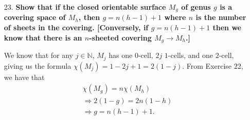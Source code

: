 \documentclass[a4paper,12pt]{article}
\begin{document}
\begin{enumerate}
    \item[23.]
        \boldmath\textbf{Show that if the closed orientable surface $M_g$ of genus $g$ is a covering space of $M_h$, then $g = n(h - 1) + 1$ where $n$ is the number of sheets in the covering. [Conversely, if $g = n(h - 1) + 1$ then we know that there is an $n$-sheeted covering $M_g \to M_h$.]
        }\unboldmath \par
        We know that for any $j \in \mathbb{N}$, $M_j$ has one $0$-cell, $2j$ $1$-cells, and one $2$-cell, giving us the formula $\chi(M_j) = 1 - 2j + 1 = 2(1 - j)$. From Exercise 22, we have that
        \begin{gather*}
            \chi(M_g) = n\chi(M_h) \\
            \Rightarrow 2(1 - g) = 2n(1 - h) \\
            \Rightarrow g = n(h - 1) + 1.
        \end{gather*}
\end{enumerate}
\end{document}
